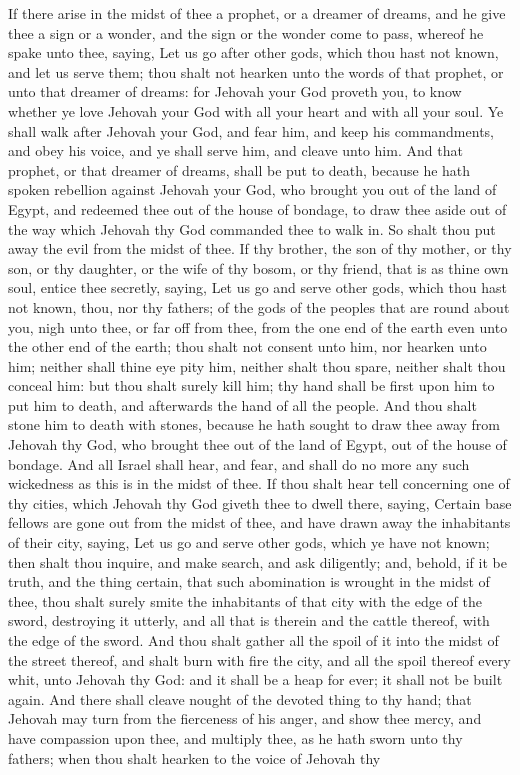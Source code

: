 If there arise in the midst of thee a prophet, or a dreamer of dreams, and he give thee a sign or a wonder, and the sign or the wonder come to pass, whereof he spake unto thee, saying, Let us go after other gods, which thou hast not known, and let us serve them; thou shalt not hearken unto the words of that prophet, or unto that dreamer of dreams: for Jehovah your God proveth you, to know whether ye love Jehovah your God with all your heart and with all your soul. Ye shall walk after Jehovah your God, and fear him, and keep his commandments, and obey his voice, and ye shall serve him, and cleave unto him. And that prophet, or that dreamer of dreams, shall be put to death, because he hath spoken rebellion against Jehovah your God, who brought you out of the land of Egypt, and redeemed thee out of the house of bondage, to draw thee aside out of the way which Jehovah thy God commanded thee to walk in. So shalt thou put away the evil from the midst of thee.  If thy brother, the son of thy mother, or thy son, or thy daughter, or the wife of thy bosom, or thy friend, that is as thine own soul, entice thee secretly, saying, Let us go and serve other gods, which thou hast not known, thou, nor thy fathers; of the gods of the peoples that are round about you, nigh unto thee, or far off from thee, from the one end of the earth even unto the other end of the earth; thou shalt not consent unto him, nor hearken unto him; neither shall thine eye pity him, neither shalt thou spare, neither shalt thou conceal him: but thou shalt surely kill him; thy hand shall be first upon him to put him to death, and afterwards the hand of all the people. And thou shalt stone him to death with stones, because he hath sought to draw thee away from Jehovah thy God, who brought thee out of the land of Egypt, out of the house of bondage. And all Israel shall hear, and fear, and shall do no more any such wickedness as this is in the midst of thee.  If thou shalt hear tell concerning one of thy cities, which Jehovah thy God giveth thee to dwell there, saying, Certain base fellows are gone out from the midst of thee, and have drawn away the inhabitants of their city, saying, Let us go and serve other gods, which ye have not known; then shalt thou inquire, and make search, and ask diligently; and, behold, if it be truth, and the thing certain, that such abomination is wrought in the midst of thee, thou shalt surely smite the inhabitants of that city with the edge of the sword, destroying it utterly, and all that is therein and the cattle thereof, with the edge of the sword. And thou shalt gather all the spoil of it into the midst of the street thereof, and shalt burn with fire the city, and all the spoil thereof every whit, unto Jehovah thy God: and it shall be a heap for ever; it shall not be built again. And there shall cleave nought of the devoted thing to thy hand; that Jehovah may turn from the fierceness of his anger, and show thee mercy, and have compassion upon thee, and multiply thee, as he hath sworn unto thy fathers; when thou shalt hearken to the voice of Jehovah thy 